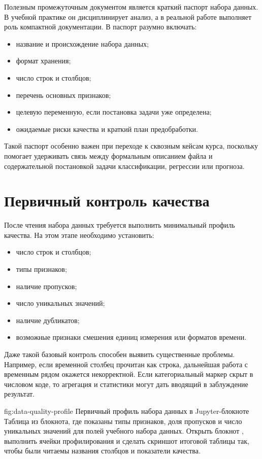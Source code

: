 Полезным промежуточным документом является краткий паспорт набора данных. В учебной практике он дисциплинирует анализ, а в реальной работе выполняет роль компактной документации. В паспорт разумно включать:
\begin{itemize}[leftmargin=1.25cm]
\item название и происхождение набора данных;
\item формат хранения;
\item число строк и столбцов;
\item перечень основных признаков;
\item целевую переменную, если постановка задачи уже определена;
\item ожидаемые риски качества и краткий план предобработки.
\end{itemize}

Такой паспорт особенно важен при переходе к сквозным кейсам курса, поскольку помогает удерживать связь между формальным описанием файла и содержательной постановкой задачи классификации, регрессии или прогноза.

\section{Первичный контроль качества}

После чтения набора данных требуется выполнить минимальный профиль качества. На этом этапе необходимо установить:
\begin{itemize}[leftmargin=1.25cm]
\item число строк и столбцов;
\item типы признаков;
\item наличие пропусков;
\item число уникальных значений;
\item наличие дубликатов;
\item возможные признаки смешения единиц измерения или форматов времени.
\end{itemize}

Даже такой базовый контроль способен выявить существенные проблемы. Например, если временной столбец прочитан как строка, дальнейшая работа с временным рядом окажется некорректной. Если категориальный маркер скрыт в числовом коде, то агрегация и статистики могут дать вводящий в заблуждение результат.

\screenshotplaceholder
  {fig:data-quality-profile}
  {Первичный профиль набора данных в Jupyter-блокноте}
  {Таблица из блокнота, где показаны типы признаков, доля пропусков и число уникальных значений для полей учебного набора данных.}
  {Открыть блокнот , выполнить ячейки профилирования и сделать скриншот итоговой таблицы так, чтобы были читаемы названия столбцов и показатели качества.}

